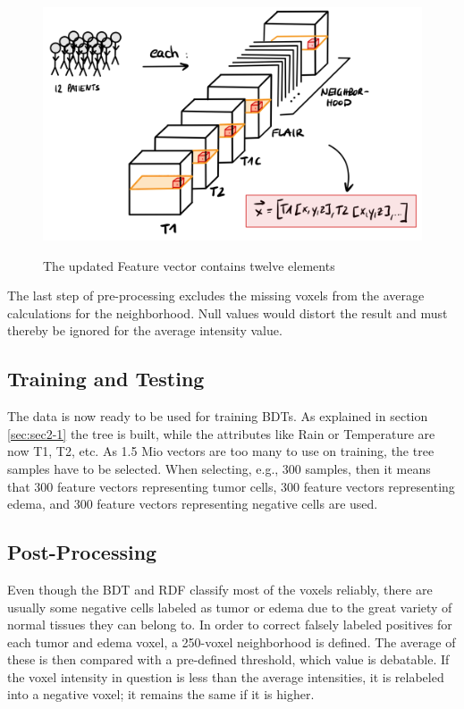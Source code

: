 \documentclass[
12pt,
headsepline,
bibliography=totoc,
twoside=semi,
fleqn
]{scrartcl}
\begin{document}
 \begin{figure}[H]
 \centering \includegraphics[scale=0.6]{BDT15.png}\label{fig:fig15}
 \caption{The updated Feature vector contains twelve elements}
 \end{figure}



 The last step of pre-processing excludes the missing voxels from the average calculations for the neighborhood. Null values would distort the result and must thereby be ignored for the average intensity value. 

 \subsection{Training and Testing\label{sec:sec3-3}}
 The data is now ready to be used for training BDTs. As explained in section \ref{sec:sec2-1} the tree is built, while the attributes like Rain or Temperature are now T1, T2, etc. As 1.5 Mio vectors are too many to use on training, the tree samples have to be selected. When selecting, e.g., 300 samples, then it means that 300 feature vectors representing tumor cells, 300 feature vectors representing edema, and 300 feature vectors representing negative cells are used. 
 
 \subsection{Post-Processing\label{sec:sec3-4}}
 Even though the BDT and RDF classify most of the voxels reliably, there are usually some negative cells labeled as tumor or edema due to the great variety of normal tissues they can belong to. In order to correct falsely labeled positives for each tumor and edema voxel, a 250-voxel neighborhood is defined. The average of these is then compared with a pre-defined threshold, which value is debatable. If the voxel intensity in question is less than the average intensities, it is relabeled into a negative voxel; it remains the same if it is higher.
\end{document}
